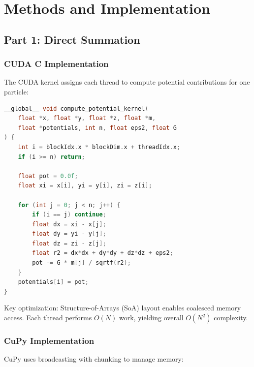 \documentclass[11pt,a4paper]{article}
\begin{document}
\section{Methods and Implementation}

\subsection{Part 1: Direct Summation}

\subsubsection{CUDA C Implementation}

The CUDA kernel assigns each thread to compute potential contributions for one particle:

\begin{lstlisting}[language=C, caption={CUDA Direct Summation kernel (simplified)}, label={lst:cuda_direct}]
__global__ void compute_potential_kernel(
    float *x, float *y, float *z, float *m,
    float *potentials, int n, float eps2, float G
) {
    int i = blockIdx.x * blockDim.x + threadIdx.x;
    if (i >= n) return;

    float pot = 0.0f;
    float xi = x[i], yi = y[i], zi = z[i];

    for (int j = 0; j < n; j++) {
        if (i == j) continue;
        float dx = xi - x[j];
        float dy = yi - y[j];
        float dz = zi - z[j];
        float r2 = dx*dx + dy*dy + dz*dz + eps2;
        pot -= G * m[j] / sqrtf(r2);
    }
    potentials[i] = pot;
}
\end{lstlisting}

Key optimization: Structure-of-Arrays (SoA) layout enables coalesced memory access. Each thread performs $O(N)$ work, yielding overall $O(N^2)$ complexity.

\subsubsection{CuPy Implementation}

CuPy uses broadcasting with chunking to manage memory:
\end{document}
